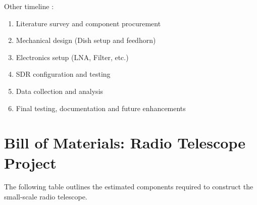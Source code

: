 \documentclass[12pt]{report}
\begin{document}
\begin{flushleft}
    Other timeline : 
    \begin{enumerate}
        \item Literature survey and component procurement
        \item Mechanical design (Dish setup and feedhorn)
        \item Electronics setup (LNA, Filter, etc.)
        \item SDR configuration and testing
        \item Data collection and analysis
        \item Final testing, documentation and future enhancements
    \end{enumerate}
    \end{flushleft}
\section*{Bill of Materials: Radio Telescope Project}
The following table outlines the estimated components required to construct the small-scale radio telescope. 
\end{document}
